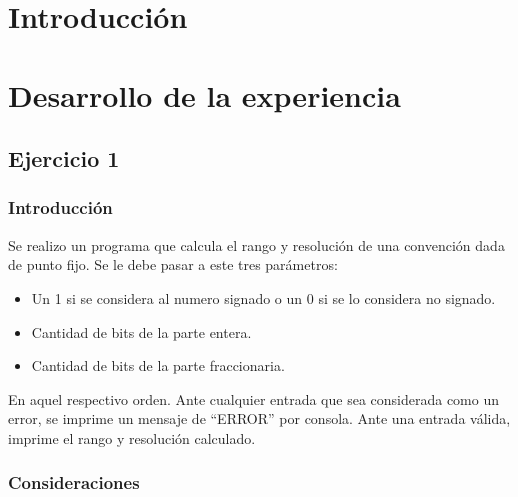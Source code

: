 \documentclass[a4paper]{article}
\newcommand{\quotes}[1]{``#1''}
\begin{document}




\section*{Introducción}


\section*{Desarrollo de la experiencia}

\subsection*{Ejercicio 1}
\subsubsection*{Introducción}
Se realizo un programa que calcula el rango y resolución de una convención dada de punto fijo. Se le debe pasar a este tres parámetros:
\begin{itemize}
\item Un 1 si se considera al numero signado o un 0 si se lo considera no signado.
\item Cantidad de bits de la parte entera.
\item Cantidad de bits de la parte fraccionaria.
\end{itemize}
En aquel respectivo orden. Ante cualquier entrada que sea considerada como un error, se imprime un mensaje de \quotes{ERROR} por consola. Ante una entrada válida, imprime el rango y resolución calculado.

\subsubsection*{Consideraciones}
\end{document}
